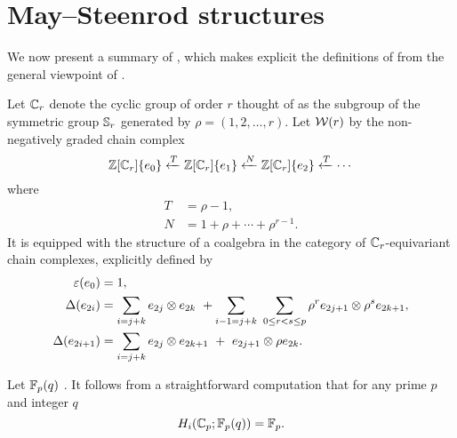
\section{May--Steenrod structures}

We now present a summary of \cite{medina2021may_st}, which makes explicit the definitions of \cite{steenrod1953cyclic} from the general viewpoint of \cite{may1970general}.

\sssec\label{sss:minimal resolution}

Let $\mathbb{C}_r$ denote the cyclic group of order $r$ thought of as the subgroup of the symmetric group $\mathbb{S}_r$ generated by $\rho = (1,2,\dots,r)$.
Let $\mathcal{W}(r)$ by the non-negatively graded chain complex
\begin{equation} \label{eq: minimal resolution}
	\mathbb{Z}[\mathbb{C}_r]\{e_0\} \xleftarrow{T} \mathbb{Z}[\mathbb{C}_r]\{e_1\} \xleftarrow{N} \mathbb{Z}[\mathbb{C}_r]\{e_2\} \xleftarrow{T} \cdots
\end{equation}
where
\begin{equation} \label{eq: T and R definition}
	\begin{split}
		T &= \rho - 1, \\
		N &= 1 + \rho + \cdots + \rho^{r-1}.
	\end{split}
\end{equation}
It is equipped with the structure of a coalgebra in the category of $\mathbb{C}_r$-equivariant chain complexes, explicitly defined by
\begin{align*}
	\varepsilon(e_0) &= 1, \\
	\Delta(e_{2i}) &=
	\sum_{i=j+k} e_{2j} \otimes e_{2k} \ + \sum_{i-1=j+k} \ \sum_{0 \leq r < s \leq p} \rho^r e_{2j+1} \otimes \rho^s e_{2k+1}, \\
	\Delta(e_{2i+1}) &=
	\sum_{i=j+k} e_{2j} \otimes e_{2k+1} \ +\ e_{2j+1} \otimes \rho e_{2k}.
\end{align*}

\sssec

Let ${\mathbb{F}_p}(q)$ \TBW.
It follows from a straightforward computation that for any prime $p$ and integer $q$
\begin{equation*}
	H_i(\mathbb{C}_p; {\mathbb{F}_p}(q)) = {\mathbb{F}_p}.
\end{equation*}

\sssec

